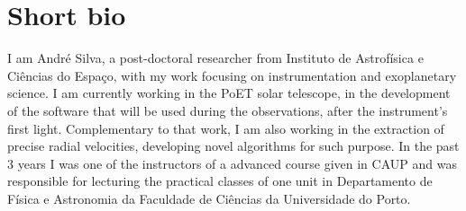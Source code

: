\documentclass[11pt,a4paper,sans]{moderncv}
\begin{document}
\makecvtitle

\section{Short bio}

I am André Silva, a post-doctoral researcher from Instituto de Astrofísica e Ciências do Espaço, with my work focusing on instrumentation and exoplanetary science. I am currently working in the PoET solar telescope, in the development of the software that will be used during the observations, after the instrument's first light. Complementary to that work, I am also working in the extraction of precise radial velocities, developing novel algorithms for such purpose. In the past 3 years I was one of the instructors of a advanced course given in CAUP and was responsible for lecturing the practical classes of one unit in Departamento de Física e Astronomia da Faculdade de Ciências da Universidade do Porto.











 
% 
\end{document}

